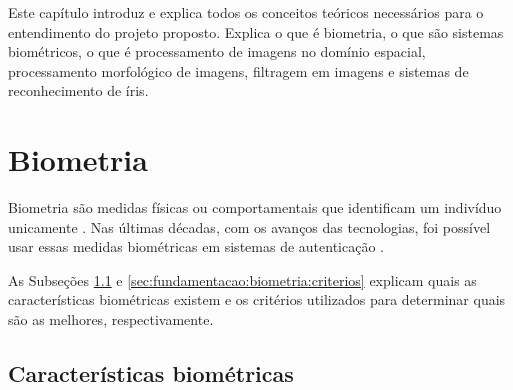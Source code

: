 \newcommand{\texCommand}[1]{\texttt{\textbackslash{#1}}}%

\newcommand{\exemplo}[1]{%
\vspace{\baselineskip}%
\noindent\fbox{\begin{minipage}{\textwidth}#1\end{minipage}}%
\\\vspace{\baselineskip}}%

\newcommand{\exemploVerbatim}[1]{%
\vspace{\baselineskip}%
\noindent\fbox{\begin{minipage}{\textwidth}%
#1\end{minipage}}%
\\\vspace{\baselineskip}}%

Este capítulo introduz e explica todos os conceitos teóricos necessários para o entendimento do projeto proposto. Explica o que é biometria, o que são sistemas biométricos, o que é processamento de imagens no domínio espacial, processamento morfológico de imagens, filtragem em imagens e sistemas de reconhecimento de íris.

\section{Biometria} \label{sec:fundamentacao:biometria}

\par Biometria são medidas físicas ou comportamentais que identificam um indivíduo unicamente \cite{li2009encyclopedia}. Nas últimas décadas, com os avanços das tecnologias, foi possível usar essas medidas biométricas em sistemas de autenticação \cite{wayman2005biometric}. 

\par As Subseções \ref{sec:fundamentacao:biometria:caracteristicas} e \ref{sec:fundamentacao:biometria:criterios} explicam quais as características biométricas existem e os critérios utilizados para determinar quais são as melhores, respectivamente. 

\subsection{Características biométricas}\label{sec:fundamentacao:biometria:caracteristicas}

